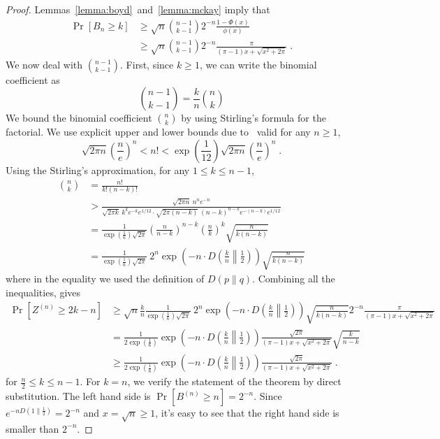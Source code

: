 \documentclass{article}
\begin{document}
\begin{proof}
Lemmas~\ref{lemma:boyd}~and~\ref{lemma:mckay} imply that
\begin{align*}
\Pr \left[ B_n \ge k \right]
& \ge \sqrt{n} \binom{n-1}{k-1} 2^{-n} \frac{1 - \Phi(x)}{\phi(x)} \\
& \ge \sqrt{n} \binom{n-1}{k-1} 2^{-n} \frac{\pi}{(\pi-1)x+\sqrt{x^2+2 \pi}} \; .
\end{align*}
We now deal with $\binom{n-1}{k-1}$. First, since $k \ge 1$, we can write the binomial coefficient as
$$
\binom{n-1}{k-1} = \frac{k}{n} \binom{n}{k}
$$
We bound the binomial coefficient $\binom{n}{k}$ by using Stirling's formula for the factorial.
We use explicit upper and lower bounds due to~\cite{Robbins-1955} valid for any $n\ge 1$,
$$
\sqrt{2 \pi n} \left( \frac{n}{e} \right)^n < n! < \exp\left(\frac{1}{12}\right) \sqrt{2 \pi n} \left( \frac{n}{e} \right)^n \; .
$$
Using the Stirling's approximation, for any $1\le k \le n-1$,
\begin{align*}
\binom{n}{k}
& = \frac{n!}{k! (n-k)!} \\
& > \frac{\sqrt{2\pi n} \ n^n e^{-n}}{\sqrt{2\pi k} \ k^k e^{-k} e^{1/12} \cdot \sqrt{2\pi (n-k)} \ (n-k)^{n-k} e^{-(n-k)} e^{1/12}} \\
& = \frac{1}{\exp\left(\frac{1}{6}\right) \sqrt{2 \pi}} \left(\frac{n}{n-k}\right)^{n-k} \left(\frac{n}{k}\right)^k \sqrt{\frac{n}{k(n-k)}} \\
& = \frac{1}{\exp\left(\frac{1}{6}\right) \sqrt{2 \pi}} \ 2^n \exp\left(-n \cdot D\left(\frac{k}{n} \middle\| \frac{1}{2}\right)\right) \sqrt{\frac{n}{k(n-k)}}
\end{align*}
where in the equality we used the definition of $D(p\|q)$. Combining all the inequalities, gives
\begin{align*}
\Pr \left[ Z^{(n)} \ge 2k - n \right]
& \ge \sqrt{n} \frac{k}{n} \frac{1}{\exp\left(\frac{1}{6}\right) \sqrt{2 \pi}} \ 2^n \exp\left(-n \cdot D\left(\frac{k}{n} \middle\| \frac{1}{2}\right)\right) \sqrt{\frac{n}{k(n-k)}} 2^{-n} \frac{\pi}{(\pi-1)x+\sqrt{x^2+2 \pi}} \\
& = \frac{1}{2\exp\left(\frac{1}{6}\right)} \exp\left(-n \cdot D\left(\frac{k}{n} \middle\| \frac{1}{2}\right)\right) \frac{\sqrt{2\pi}}{(\pi-1)x+\sqrt{x^2+2 \pi}} \sqrt{\frac{k}{n-k}} \\
& \ge \frac{1}{2\exp\left(\frac{1}{6}\right)} \exp\left(-n \cdot D\left(\frac{k}{n} \middle\| \frac{1}{2}\right)\right) \frac{\sqrt{2\pi}}{(\pi-1)x+\sqrt{x^2+2 \pi}} \; .
\end{align*}
for $\frac{n}{2} \le k \le n - 1$. For $k=n$, we verify the statement of the theorem by direct substitution. The left hand side is $\Pr[B^{(n)} \ge n] = 2^{-n}$.
Since $e^{-nD(1\|\frac{1}{2})} = 2^{-n}$ and $x=\sqrt{n} \ge 1$, it's easy to see that the right hand side is smaller than $2^{-n}$.
\end{proof}
\end{document}
